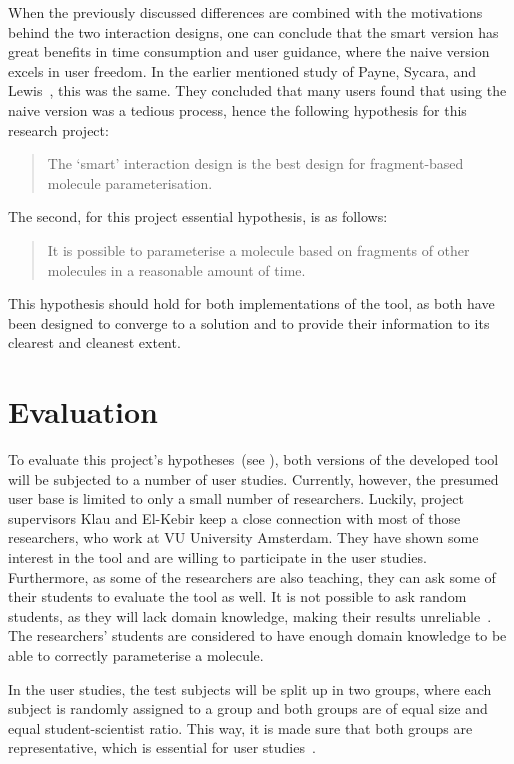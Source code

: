 When the previously discussed differences are combined with the motivations behind the two interaction designs, one can conclude that the smart version has great benefits in time consumption and user guidance, where the naive version excels in user freedom. In the earlier mentioned study of Payne, Sycara, and Lewis~\cite{payne2000varying}, this was the same. They concluded that many users found that using the naive version was a tedious process, hence the following hypothesis for this research project:
\begin{quote}
The `smart' interaction design is the best design for fragment-based molecule parameterisation.
\end{quote}

The second, for this project essential hypothesis, is as follows:
\begin{quote}
It is possible to parameterise a molecule based on fragments of other molecules in a reasonable amount of time.
\end{quote}
This hypothesis should hold for both implementations of the tool, as both have been designed to converge to a solution and to provide their information to its clearest and cleanest extent.


\section{Evaluation}

To evaluate this project's hypotheses~(see ), both versions of the developed tool will be subjected to a number of user studies. Currently, however, the presumed user base is limited to only a small number of researchers. Luckily, project supervisors Klau and El-Kebir keep a close connection with most of those researchers, who work at VU University Amsterdam. They have shown some interest in the tool and are willing to participate in the user studies. Furthermore, as some of the researchers are also teaching, they can ask some of their students to evaluate the tool as well. It is not possible to ask random students, as they will lack domain knowledge, making their results unreliable~\cite{jonassen2000toward}. The researchers' students are considered to have enough domain knowledge to be able to correctly parameterise a molecule.

In the user studies, the test subjects will be split up in two groups, where each subject is randomly assigned to a group and both groups are of equal size and equal student-scientist ratio. This way, it is made sure that both groups are representative, which is essential for user studies~\cite{wohlin2003empirical}.


